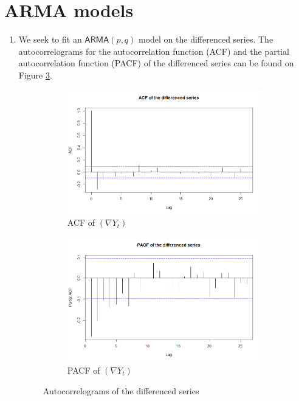 \documentclass[12pt]{article}
\newcommand{\ARMA}{\textsf{ARMA}}
\begin{document}
    \section{ARMA models}

    \begin{enumerate}
        \item We seek to fit an $\ARMA(p, q)$ model on the differenced series. The autocorrelograms for the autocorrelation function (ACF) and the partial autocorrelation function (PACF) of the differenced series can be found on Figure \ref{fig:autocorrelograms}.
        \begin{figure}[h]
            \centering
            \begin{subfigure}[b]{0.49\linewidth}
                \centering
                \includegraphics[width=\linewidth]{ACF ydiff.png}
                \caption{ACF of $(\nabla Y_t)$}
                \label{fig:acf_ydiff}
            \end{subfigure}
            \hfill
            \begin{subfigure}[b]{0.49\linewidth}
                \centering
                \includegraphics[width=\linewidth]{PACF ydiff.png}
                \caption{PACF of $(\nabla Y_t)$}
                \label{fig:pacf_ydiff}
            \end{subfigure}
            \caption{Autocorrelograms of the differenced series}
            \label{fig:autocorrelograms}
        \end{figure}


\end{enumerate}
\end{document}
